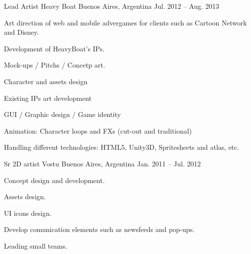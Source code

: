 \begin{cventries}
  \cventry
    {Lead Artist} %
    {Heavy Boat} %
    {Buenos Aires, Argentina} %
    {Jul. 2012 – Aug. 2013} %
    {
      \begin{cvitems} %
       \item {Art direction of web and mobile advergames for clients such as Cartoon Network and Disney.}
       \item {Development of HeavyBoat's IPs.}
       \item {Mock-ups / Pitchs / Concetp art.}
       \item {Character and assets design}
       \item {Existing IPs art development}
       \item {GUI / Graphic design / Game identity}
       \item {Animation: Character loops and FXs (cut-out and traditional)}
       \item {Handling different technologies: HTML5, Unity3D, Spritesheets and atlas, etc.}
      \end{cvitems}
    }
  \cventry
    {Sr 2D artist} %
    {Vostu} %
    {Buenos Aires, Argentina} %
    {Jan. 2011 – Jul. 2012 } %
    {
      \begin{cvitems} %
        \item {Concept design and development.}
        \item {Assets design.}
        \item {UI icons design.}
        \item {Develop comunication elements such as newsfeeds and pop-ups.}
        \item {Leading small teams.}
      \end{cvitems}
    }


\end{cventries}
